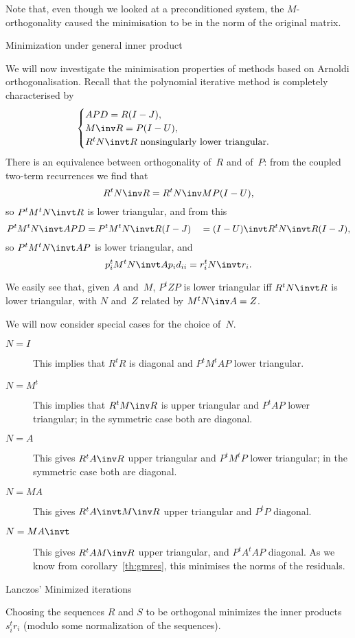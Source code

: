 Note that, even though we looked at a preconditioned system, the
$M$-orthogonality caused the minimisation to be in the norm of the
original matrix.

 {Minimization under general inner product}
\label{sec:min-general-inprod}

We will now investigate the minimisation properties of methods based
on Arnoldi orthogonalisation.
Recall that the polynomial iterative method
is completely characterised by
\[ \begin{cases}APD=R(I-J),\cr M\inv R=P(I-U),\cr
                 \hbox{$R^tN\invt R$ nonsingularly lower triangular}.\end{cases} \]
There is an equivalence between orthogonality of~$R$ and of~$P$:
from the coupled two-term recurrences we find that
\[ R^tN\inv R=R^tN\inv MP(I-U), \]
so $P^tM^tN\invt R$ is lower triangular, and from this
\[ P^tM^tN\invt APD=P^tM^tN\invt R(I-J)\quad=(I-U)\invt R^tN\invt R(I-J), \]
so $P^tM^tN\invt AP$ is lower triangular, and
\[ p_i^tM^tN\invt Ap_id_{ii}=r_i^tN\invt r_i. \]

We easily see that, given $A$ and~$M$, $P^tZP$ is lower triangular iff
$R^tN\invt R$ is lower triangular, with $N$ and~$Z$ related by
$M^tN\inv A=\nobreak Z$.

We will now consider special cases for the choice of~$N$.
\begin{description}
\item[$N=I$] This implies that $R^tR$ is diagonal and 
$P^tM^tAP$ lower triangular.
\item[$N=M^t$] This implies that $R^tM\inv R$ is upper triangular
and $P^tAP$ lower triangular; in the symmetric case both are diagonal.
\item[$N=A$] This gives $R^tA\inv R$ upper triangular
and $P^tM^tP$ lower triangular; in the symmetric case both are diagonal.
\item[$N=MA$] This gives $R^tA\invt M\inv R$ upper triangular
and $P^tP$ diagonal.
\item[$N=MA\invt$] This gives $R^tAM\inv R$ upper triangular,
and $P^tA^tAP$ diagonal. As we know from corollary~\ref{th:gmres},
this minimises the norms of the residuals.
\end{description}

 {Lanczos' Minimized iterations}
\FurtherReading

\begin{theorem}\label{minimum:2}
Choosing the sequences $R$ and $S$ to be orthogonal minimizes
the inner products $s_i^tr_i$
(modulo some normalization of the sequences).
\end{theorem}

